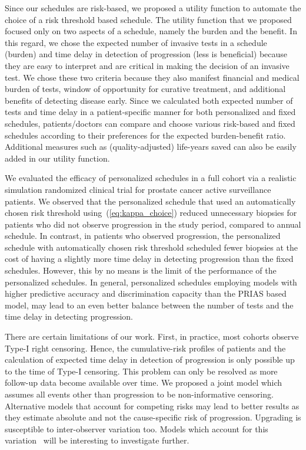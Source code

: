Since our schedules are risk-based, we proposed a utility function to automate the choice of a risk threshold based schedule. The utility function that we proposed focused only on two aspects of a schedule, namely the burden and the benefit. In this regard, we chose the expected number of invasive tests in a schedule (burden) and time delay in detection of progression (less is beneficial) because they are easy to interpret and are critical in making the decision of an invasive test. We chose these two criteria because they also manifest financial and medical burden of tests, window of opportunity for curative treatment, and additional benefits of detecting disease early. Since we calculated both expected number of tests and time delay in a patient-specific manner for both personalized and fixed schedules, patients/doctors can compare and choose various risk-based and fixed schedules according to their preferences for the expected burden-benefit ratio. Additional measures such as (quality-adjusted) life-years saved can also be easily added in our utility function. 

We evaluated the efficacy of personalized schedules in a full cohort via a realistic simulation randomized clinical trial for prostate cancer active surveillance patients. We observed that the personalized schedule that used an automatically chosen risk threshold using~(\ref{eq:kappa_choice}) reduced unnecessary biopsies for patients who did not observe progression in the study period, compared to annual schedule. In contrast, in patients who observed progression, the personalized schedule with automatically chosen risk threshold scheduled fewer biopsies at the cost of having a slightly more time delay in detecting progression than the fixed schedules. However, this by no means is the limit of the performance of the personalized schedules. In general, personalized schedules employing models with higher predictive accuracy and discrimination capacity than the PRIAS based model, may lead to an even better balance between the number of tests and the time delay in detecting progression.

There are certain limitations of our work. First, in practice, most cohorts observe Type-I right censoring. Hence, the cumulative-risk profiles of patients and the calculation of expected time delay in detection of progression is only possible up to the time of Type-I censoring. This problem can only be resolved as more follow-up data become available over time. We proposed a joint model which assumes all events other than progression to be non-informative censoring. Alternative models that account for competing risks may lead to better results as they estimate absolute and not the cause-specific risk of progression. Upgrading is susceptible to inter-observer variation too. Models which account for this variation~\citep{coley2017prediction,balasubramanian2003estimation} will be interesting to investigate further.